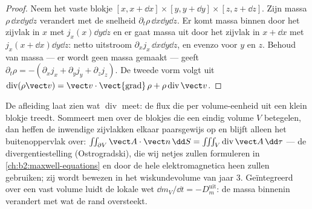 \begin{proof}
Neem het vaste blokje
$[x, x + \dd x]\times[y, y + \dd y]\times[z, z + \dd z]$. Zijn massa
$\rho\,\dd x\dd y\dd z$ verandert met de snelheid
$\partial_t\rho\,\dd x\dd y
\dd z$. Er komt massa binnen door het zijvlak in
$x$ met $j_x(x)\dd y\dd z$ en er gaat massa uit door het zijvlak in
$x + \dd x$ met $j_x(x + \dd x)\dd y\dd z$: netto uitstroom
$\partial_xj_x\,\dd x\dd y\dd z$, en evenzo voor $y$ en $z$. Behoud van
massa --- er wordt geen massa gemaakt --- geeft
$\partial_t\rho = -
(\partial_xj_x + \partial_yj_y + \partial_zj_z)$. De
tweede vorm volgt uit
$\operatorname{div}(\rho\vect v) = \vect v\cdot\operatorname{\vect{grad}}\rho +
\rho\operatorname{div}\vect v$.
\end{proof}

\begin{remark}\label{rem:b2:fluid-kinematics:divergence}
De afleiding laat zien wat $\operatorname{div}$ meet: de flux die per
volume-eenheid uit een klein blokje treedt. Sommeert men over de blokjes die
een eindig volume $V$ betegelen, dan heffen de inwendige zijvlakken elkaar
paarsgewijs op en blijft alleen het buitenoppervlak over:
$\iint_{\partial V}\vect A\cdot\vect n\,\dd S = \iiint_V
\operatorname{div}\vect A\,\dd\tau$
--- de divergentiestelling (Ostrogradski), die wij netjes zullen formuleren
in \cref{ch:b2:maxwell-equations} en door de hele elektromagnetica heen
zullen gebruiken; zij wordt bewezen in het wiskundevolume van jaar 3.
Geïntegreerd over een vast volume luidt de lokale wet
$\dd m_V/\dd t = -D_m^{\text{uit}}$: de massa binnenin verandert met wat de
rand oversteekt.
\end{remark}

